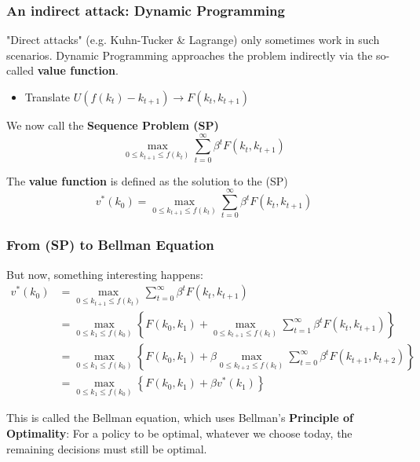 \documentclass[aspectratio=169]{beamer}
\begin{document}
\begin{frame}
\frametitle{An indirect attack: Dynamic Programming}
"Direct attacks" (e.g. Kuhn-Tucker \& Lagrange) only sometimes work in such scenarios. Dynamic Programming approaches the problem indirectly via the so-called \textbf{value function}.

\begin{itemize}
\item Translate $U(f(k_t) - k_{t+1}) \rightarrow F(k_t, k_{t+1})$
\end{itemize}

We now call the \textbf{Sequence Problem (SP)}
\begin{equation}
	\max_{0 \leq k_{t+1} \leq f(k_t)} \sum^{\infty}_{t=0} \beta^t F(k_t, k_{t+1}) \tag{SP}
\end{equation}

The \textbf{value function} is defined as the solution to the (SP)
\begin{equation*}
	v^{*}(k_0) = \max_{0 \leq k_{t+1} \leq f(k_t)} \sum^{\infty}_{t=0} \beta^t F(k_t, k_{t+1})
\end{equation*}
\end{frame}

\begin{frame}
\frametitle{From (SP) to Bellman Equation}
But now, something interesting happens:
\begin{align*}
	v^{*}(k_0)&= \max_{0 \leq k_{t+1} \leq f(k_t)} \sum^{\infty}_{t=0} \beta^t F(k_t, k_{t+1}) \\
	&= \max_{0 \leq k_{1} \leq f(k_0)} \left\lbrace F(k_0, k_1) + \max_{0 \leq k_{t+1} \leq f(k_t)} \sum^{\infty}_{t=1} \beta^t F(k_t, k_{t+1}) \right\rbrace \\
	&= \max_{0 \leq k_{1} \leq f(k_0)} \left\lbrace F(k_0, k_1) + \beta \max_{0 \leq k_{t+2} \leq f(k_t)} \sum^{\infty}_{t=0} \beta^t F(k_{t+1}, k_{t+2}) \right\rbrace	\\
	&= \max_{0 \leq k_{1} \leq f(k_0)} \left\lbrace F(k_0, k_1) + \beta v^*(k_1) \right\rbrace
\end{align*}

This is called the Bellman equation, which uses Bellman's \textbf{Principle of Optimality}: For a policy to be optimal, whatever we choose today, the remaining decisions must still be optimal.
\end{frame}
\end{document}
